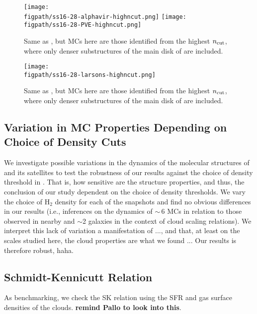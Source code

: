 \documentclass[apj]{emulateapj} %
\begin{document}
\begin{figure*}[htbp]
\centering
\texttt{[image: \\figpath/ss16-28-alphavir-highncut.png]}
\texttt{[image: \\figpath/ss16-28-PVE-highncut.png]}
\caption{
Same as , but MCs here are those identified from the highest $n_{\rm cut}$,
where only denser substructures of the main disk of \flower are included. 
\label{fig:alpha16-28-highncut}}
\end{figure*}

\begin{figure*}[htbp]
\centering
\texttt{[image: \\figpath/ss16-28-larsons-highncut.png]}  
\caption{
Same as , but MCs here are those identified from the highest $n_{\rm cut}$,
where only denser substructures of the main disk of \flower are included. 
\label{fig:larsons16-28-highncut}}
\end{figure*}



\subsection{Variation in MC Properties Depending on Choice of Density Cuts}	 \label{sec:ncut}
We investigate possible variations in the dynamics of the molecular structures of \flower and its satellites 
to test 
the robustness of our results against the choice of density threshold in .
That is, how sensitive are the structure properties, and thus, the conclusion of our study
dependent on the choice of density thresholds.
We vary the choice of H$_2$ density for each of the snapshots and 
find no obvious differences in our results (i.e., inferences on the dynamics of \z$\sim$\,6 
MCs in relation to those observed in nearby and \z$\sim$2 galaxies in the context of 
cloud scaling relations).
We interpret this lack of variation a manifestation of ..., and that, at least on the scales studied here, the cloud properties are what we found ... 
Our results is therefore robust, haha.




\subsection{Schmidt-Kennicutt Relation}
As benchmarking, we check the SK relation using the SFR and gas surface densities of the clouds. {\bf remind Pallo to look into this}.
\end{document}
